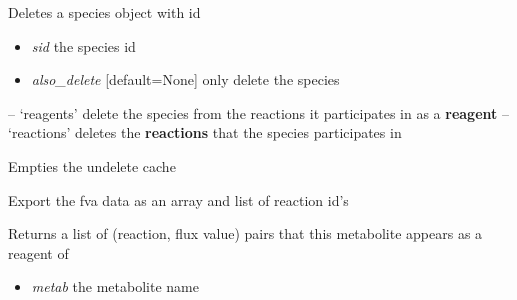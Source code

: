 \documentclass[a4paper,11pt,english]{sphinxmanual}
\begin{document}
\begin{fulllineitems}

\begin{fulllineitems}
\label{modules_doc:cbmpy.CBModel.Model.deleteSpecies}
Deletes a species object with id
\begin{itemize}
\item {} 
\emph{sid} the species id

\item {} 
\emph{also\_delete} {[}default=None{]} only delete the species

\end{itemize}

-- `reagents' delete the species from the reactions it participates in as a \textbf{reagent}
-- `reactions' deletes the \textbf{reactions} that the species participates in

\end{fulllineitems}


\begin{fulllineitems}
\label{modules_doc:cbmpy.CBModel.Model.emptyUndelete}
Empties the undelete cache

\end{fulllineitems}


\begin{fulllineitems}
\label{modules_doc:cbmpy.CBModel.Model.exportFVAdata}
Export the fva data as an array and list of reaction id's

\end{fulllineitems}


\begin{fulllineitems}
\label{modules_doc:cbmpy.CBModel.Model.findFluxesForConnectedSpecies}
Returns a list of (reaction, flux value) pairs that this metabolite appears as a reagent of
\begin{itemize}
\item {} 
\emph{metab} the metabolite name


\end{itemize}
\end{fulllineitems}
\end{fulllineitems}
\end{document}
